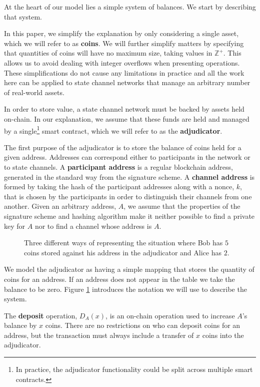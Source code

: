 \documentclass{article}
\begin{document}
At the heart of our model lies a simple system of balances. 
We start by describing that system.

In this paper, we simplify the explanation by only considering a single asset, which we will refer to as \textbf{coins}.
We will further simplify matters by specifying that quantities of coins will have no maximum
size, taking values in $\mathbb{Z}^+$.
This allows us to avoid dealing with integer overflows when presenting operations.
These simplifications do not cause any limitations in practice and all the work
here can be applied to state channel networks that manage an arbitrary number of 
real-world assets.

In order to store value, a state channel network must be backed by assets held on-chain.
In our explanation, we assume that these funds are held and managed by a single\footnote{
In practice, the adjudicator functionality could be split across multiple smart contracts.
} smart contract,
which we will refer to as the \textbf{adjudicator}.

The first purpose of the adjudicator is to store the balance of coins held for a given address.
Addresses can correspond either to participants in the network or to state channels.
A \textbf{participant address} is a regular blockchain address, generated in the standard way from the signature scheme.
A \textbf{channel address} is formed by taking the hash of the participant addresses along with a nonce, $k$, that is chosen by the participants in order to distinguish their channels from one another.
Given an arbitrary address, $A$, we assume that the properties of the signature scheme and hashing algorithm make it neither possible to find a private key for $A$ nor to find a channel whose address is $A$.

\begin{figure}[h]\centering
  \makebox[\textwidth][c]{}
  \caption{
    Three different ways of representing the situation where Bob has $5$ coins
    stored against his address in the adjudicator and Alice has $2$.
  }\label{fig:balance-notation}
\end{figure}

We model the adjudicator as having a simple mapping that stores the quantity of coins for
an address.
If an address does not appear in the table we take the balance to be zero.
Figure \ref{fig:balance-notation} introduces the notation we will use to describe the system.

The \textbf{deposit} operation, $D_A(x)$, is an on-chain operation used to increase $A$'s balance by $x$ coins.
There are no restrictions on who can deposit coins for an address, but the
transaction must always include a transfer of $x$ coins into the adjudicator.
\end{document}
